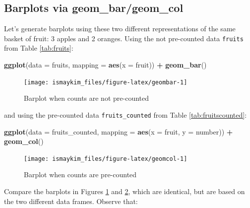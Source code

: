 \documentclass[12pt,]{krantz}
\makeatletter
\newenvironment{Shaded}{\begin{snugshade}}{\end{snugshade}}
\newcommand{\KeywordTok}[1]{\textcolor[rgb]{0.27,0.27,0.27}{\textbf{#1}}}
\newcommand{\DataTypeTok}[1]{\textcolor[rgb]{0.27,0.27,0.27}{#1}}
\newcommand{\StringTok}[1]{\textcolor[rgb]{0.5,0.5,0.5}{#1}}
\newcommand{\OperatorTok}[1]{\textcolor[rgb]{0.43,0.43,0.43}{\textbf{#1}}}
\newcommand{\NormalTok}[1]{#1}
\newenvironment{kframe}{%
\medskip{}
\setlength{\fboxsep}{.8em}
 \def\at@end@of@kframe{}%
 \ifinner\ifhmode%
  \def\at@end@of@kframe{\end{minipage}}%
  \begin{minipage}{\columnwidth}%
 \fi\fi%
 \def\FrameCommand##1{\hskip\@totalleftmargin \hskip-\fboxsep
 \colorbox{shadecolor}{##1}\hskip-\fboxsep
     \hskip-\linewidth \hskip-\@totalleftmargin \hskip\columnwidth}%
 \MakeFramed {\advance\hsize-\width
   \@totalleftmargin\z@ \linewidth\hsize
   \@setminipage}}%
 {\par\unskip\endMakeFramed%
 \at@end@of@kframe}
\renewenvironment{Shaded}{\begin{kframe}}{\end{kframe}}
\theoremstyle{definition}
\theoremstyle{definition}
\theoremstyle{definition}
\theoremstyle{remark}
\makeatother
\begin{document}
\subsection{Barplots via
geom\_bar/geom\_col}\label{barplots-via-geom_bargeom_col}

Let's generate barplots using these two different representations of the
same basket of fruit: 3 apples and 2 oranges. Using the not pre-counted
data \texttt{fruits} from Table \ref{tab:fruits}:

\begin{Shaded}
\begin{Highlighting}[]
\KeywordTok{ggplot}\NormalTok{(}\DataTypeTok{data =}\NormalTok{ fruits, }\DataTypeTok{mapping =} \KeywordTok{aes}\NormalTok{(}\DataTypeTok{x =}\NormalTok{ fruit)) }\OperatorTok{+}
\StringTok{  }\KeywordTok{geom_bar}\NormalTok{()}
\end{Highlighting}
\end{Shaded}

\begin{figure}

{\centering \texttt{[image: ismaykim\_files/figure-latex/geombar-1]} 

}

\caption{Barplot when counts are not pre-counted}\label{fig:geombar}
\end{figure}

and using the pre-counted data \texttt{fruits\_counted} from Table
\ref{tab:fruitscounted}:

\begin{Shaded}
\begin{Highlighting}[]
\KeywordTok{ggplot}\NormalTok{(}\DataTypeTok{data =}\NormalTok{ fruits_counted, }\DataTypeTok{mapping =} \KeywordTok{aes}\NormalTok{(}\DataTypeTok{x =}\NormalTok{ fruit, }\DataTypeTok{y =}\NormalTok{ number)) }\OperatorTok{+}
\StringTok{  }\KeywordTok{geom_col}\NormalTok{()}
\end{Highlighting}
\end{Shaded}

\begin{figure}

{\centering \texttt{[image: ismaykim\_files/figure-latex/geomcol-1]} 

}

\caption{Barplot when counts are pre-counted}\label{fig:geomcol}
\end{figure}

Compare the barplots in Figures \ref{fig:geombar} and \ref{fig:geomcol},
which are identical, but are based on the two different data frames.
Observe that:
\end{document}
